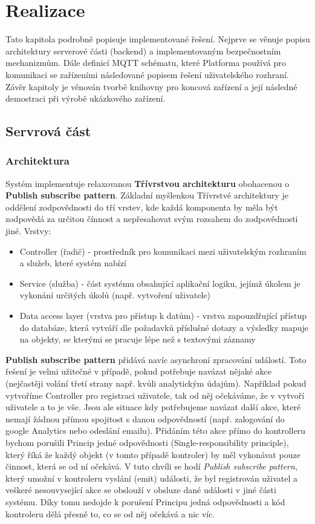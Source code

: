 \chapter{Realizace}
Tato kapitola podrobně popisuje implementované řešení. Nejprve se věnuje popisu architektury serverové části (backend) a implementovaným bezpečnostním mechanizmům. Dále definicí MQTT schématu, které Platforma používá pro komunikaci se zařízeními následované popisem řešení uživatelského rozhraní. Závěr kapitoly je věnován tvorbě knihovny pro koncová zařízení a její následné demostraci při výrobě ukázkového zařízení.

\section{Servrová část}

\subsection{Architektura}
Systém implementuje relaxovanou \textbf{Třívrstvou architekturu} obohacenou o \textbf{Publish subscribe pattern}. Základní myšlenkou Třívrstvé architektury je oddělení zodpovědnosti do tří vrstev, kde každá komponenta by měla být zodpovědá za určitou čínnost a nepřesahovat svým rozsahem do zodpovědnosti jiné. Vrstvy:
\begin{itemize}
    \item Controller (řadič) - prostředník pro komunikaci mezi uživatelským rozhraním a služeb, které systém nabízí
    \item Service (služba) - část systému obsahující aplikační logiku, jejímž úkolem je vykonání určitých úkolů (např. vytvoření uživatele)
    \item Data access layer (vrstva pro přístup k datům) - vrstva zapouzdřující přístup do databáze, která vytváří dle požadavků příslušné dotazy a výsledky mapuje na objekty, se kterými se pracuje lépe než s textovými záznamy
\end{itemize}

\textbf{Publish subscribe pattern} přidává navíc asynchroní zpracování událostí. Toto řešení je velmi užitečné v případě, pokud potřebuje navázat nějaké akce (nejčastěji volání třetí strany např. kvůli analytickým údajům). Například pokud vytvoříme Controller pro registraci uživatele, tak od něj očekáváme, že v vytvoří uživatele a to je vše. Jsou ale situace kdy potřebujeme navázat další akce, které nemají žádnou přímou spojitost s danou odpovědností (např. zalogování do google Analytics nebo odeslání emailu). Přidáním této akce přímo do kontrolleru bychom porušili Princip jedné odpovědnosti (Single-responsibility principle), který říká že každý objekt (v tomto případě kontroler) by měl vykonávat pouze činnost, která se od ní očekává. V tuto chvíli se hodí  \textit{Publish subscribe pattern}, který umožní v kontroleru vyslání (emit) události, že byl registrován uživatel a veškeré nesouvysející akce se obslouží v obsluze dané události v jiné části systému. Díky tomu nedojde k porušení Principu jedná odpovědnosti a kód kontroleru dělá přesně to, co se od něj očekává a nic víc.


